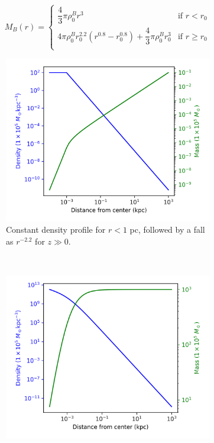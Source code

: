 			\begin{equation}
				M_B(r) = \left \{
				\begin{matrix}
				\dfrac{4}{3}\pi\rho_0^Br^3 & \text{if $r < r_0$}\\
				4\pi\rho_0^Br_0^{2.2} \left(r^{0.8} - r_0^{0.8}\right) + \dfrac{4}{3}\pi\rho_0^Br_0^3 & \text{if $r \geq r_0$} \\
				\end{matrix}
				\right.
			\end{equation}
			
			\pagebreak
		
			\begin{figure}[h]
				\centering
				\begin{subfigure}[b]{0.49\textwidth}
					\includegraphics[width=\textwidth]{"../Files/Week 3/gaseous"}
					\caption{Constant density profile for $r < 1$ pc, followed by a fall as $r^{-2.2}$ for $z \gg 0$.}
					\label{fig: baryonicprofilehigh}
				\end{subfigure}
				~ 
				\begin{subfigure}[b]{0.49\textwidth}
					\includegraphics[width=\textwidth]{"../Files/Week 3/hernquist"}

\end{subfigure}
\end{figure}
